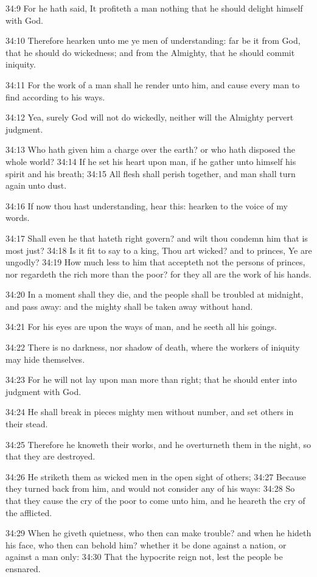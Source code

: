 34:9 For he hath said, It profiteth a man nothing that he should delight himself with God.

34:10 Therefore hearken unto me ye men of understanding: far be it from God, that he should do wickedness; and from the Almighty, that he should commit iniquity.

34:11 For the work of a man shall he render unto him, and cause every man to find according to his ways.

34:12 Yea, surely God will not do wickedly, neither will the Almighty pervert judgment.

34:13 Who hath given him a charge over the earth? or who hath disposed the whole world?  34:14 If he set his heart upon man, if he gather unto himself his spirit and his breath; 34:15 All flesh shall perish together, and man shall turn again unto dust.

34:16 If now thou hast understanding, hear this: hearken to the voice of my words.

34:17 Shall even he that hateth right govern? and wilt thou condemn him that is most just?  34:18 Is it fit to say to a king, Thou art wicked? and to princes, Ye are ungodly?  34:19 How much less to him that accepteth not the persons of princes, nor regardeth the rich more than the poor? for they all are the work of his hands.

34:20 In a moment shall they die, and the people shall be troubled at midnight, and pass away: and the mighty shall be taken away without hand.

34:21 For his eyes are upon the ways of man, and he seeth all his goings.

34:22 There is no darkness, nor shadow of death, where the workers of iniquity may hide themselves.

34:23 For he will not lay upon man more than right; that he should enter into judgment with God.

34:24 He shall break in pieces mighty men without number, and set others in their stead.

34:25 Therefore he knoweth their works, and he overturneth them in the night, so that they are destroyed.

34:26 He striketh them as wicked men in the open sight of others; 34:27 Because they turned back from him, and would not consider any of his ways: 34:28 So that they cause the cry of the poor to come unto him, and he heareth the cry of the afflicted.

34:29 When he giveth quietness, who then can make trouble? and when he hideth his face, who then can behold him? whether it be done against a nation, or against a man only: 34:30 That the hypocrite reign not, lest the people be ensnared.

